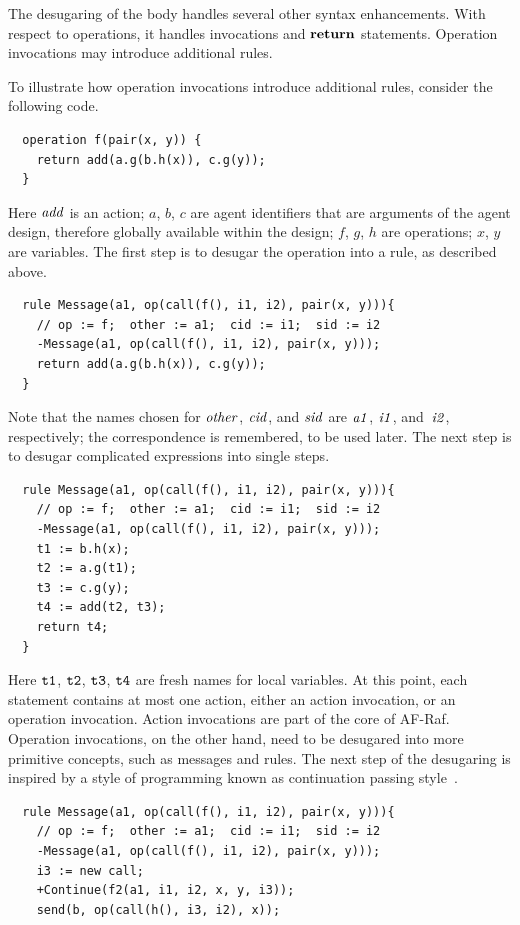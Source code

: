 \documentclass[a4paper,12pt,oneside,fleqn]{book} %
\begin{document}
The desugaring of the body handles several other syntax enhancements. With
respect to operations, it handles invocations and $\bf return$ statements.
Operation invocations may introduce additional rules.

\begin{example}
To illustrate how operation invocations introduce additional rules,
consider the following code.
\begin{verbatim}
  operation f(pair(x, y)) {
    return add(a.g(b.h(x)), c.g(y));
  }
\end{verbatim}
Here $\it add$ is an action; $a$, $b$, $c$ are agent identifiers that are
arguments of the agent design, therefore globally available within the
design; $f$, $g$, $h$ are operations; $x$, $y$ are variables. The first
step is to desugar the operation into a rule, as described above.
\begin{verbatim}
  rule Message(a1, op(call(f(), i1, i2), pair(x, y))){
    // op := f;  other := a1;  cid := i1;  sid := i2
    -Message(a1, op(call(f(), i1, i2), pair(x, y)));
    return add(a.g(b.h(x)), c.g(y));
  }
\end{verbatim}
Note that the names chosen for $\it other$, $\it cid$, and $\it sid$ are
$\it a1$, $\it i1$, and~$\it i2$, respectively; the correspondence is
remembered, to be used later.  The next step is to desugar complicated
expressions into single steps.
\begin{verbatim}
  rule Message(a1, op(call(f(), i1, i2), pair(x, y))){
    // op := f;  other := a1;  cid := i1;  sid := i2
    -Message(a1, op(call(f(), i1, i2), pair(x, y)));
    t1 := b.h(x);
    t2 := a.g(t1);
    t3 := c.g(y);
    t4 := add(t2, t3);
    return t4;
  }
\end{verbatim}
Here $\tt t1$, $\tt t2$, $\tt t3$, $\tt t4$ are fresh names for local
variables. At this point, each statement contains at most one action,
either an action invocation, or an operation invocation. Action invocations
are part of the core of AF-Raf. Operation invocations, on the other hand,
need to be desugared into more primitive concepts, such as messages and
rules. The next step of the desugaring is inspired by a style of
programming known as continuation passing
style~\cite{DBLP:conf/popl/AppelJ89}.
\begin{verbatim}
  rule Message(a1, op(call(f(), i1, i2), pair(x, y))){
    // op := f;  other := a1;  cid := i1;  sid := i2
    -Message(a1, op(call(f(), i1, i2), pair(x, y)));
    i3 := new call;
    +Continue(f2(a1, i1, i2, x, y, i3));
    send(b, op(call(h(), i3, i2), x));

\end{verbatim}
\end{example}
\end{document}
